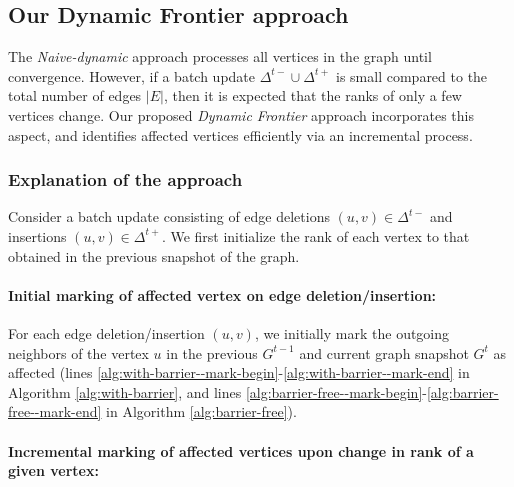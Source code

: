 \subsection{Our Dynamic Frontier approach}
\label{sec:frontier}

The \textit{Naive-dynamic} approach processes all vertices in the graph until convergence. However, if a batch update $\Delta^{t-} \cup \Delta^{t+}$ is small compared to the total number of edges $|E|$, then it is expected that the ranks of only a few vertices change. Our proposed \textit{Dynamic Frontier} approach incorporates this aspect, and identifies affected vertices efficiently via an incremental process.



\subsubsection{Explanation of the approach}
\label{sec:frontier-explanation}

Consider a batch update consisting of edge deletions $(u, v) \in \Delta^{t-}$ and insertions $(u, v) \in \Delta^{t+}$. We first initialize the rank of each vertex to that obtained in the previous snapshot of the graph.



\paragraph{Initial marking of affected vertex on edge deletion/insertion:}

For each edge deletion/insertion $(u, v)$, we initially mark the outgoing neighbors of the vertex $u$ in the previous $G^{t-1}$ and current graph snapshot $G^t$ as affected (lines \ref{alg:with-barrier--mark-begin}-\ref{alg:with-barrier--mark-end} in Algorithm \ref{alg:with-barrier}, and lines \ref{alg:barrier-free--mark-begin}-\ref{alg:barrier-free--mark-end} in Algorithm \ref{alg:barrier-free}).

\paragraph{Incremental marking of affected vertices upon change in rank of a given vertex:}

